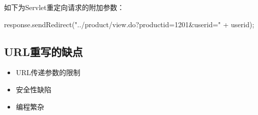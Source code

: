 如下为Servlet重定向请求的附加参数：

\begin{javaCode}
  response.sendRedirect("../product/view.do?productid=1201&userid=" + userid);
\end{javaCode}

\subsection{URL重写的缺点}

\begin{itemize}
\item URL传递参数的限制
\item 安全性缺陷
\item 编程繁杂
\end{itemize}



